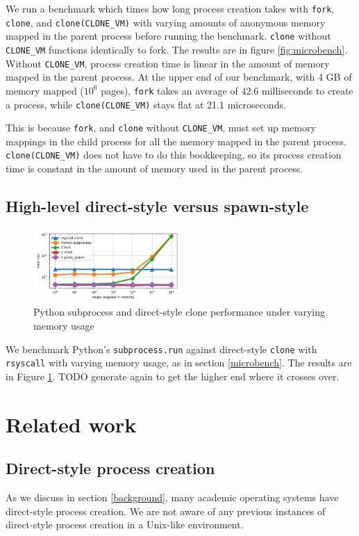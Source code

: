 \documentclass[letterpaper,twocolumn,10pt]{article}
\begin{document}
We run a benchmark which times how long process creation takes
with \texttt{fork}, \texttt{clone}, and \verb|clone(CLONE_VM)|
with varying amounts of anonymous memory mapped in the parent process
before running the benchmark.
\texttt{clone} without \verb|CLONE_VM| functions identically to fork.
The results are in figure \ref{fig:microbench}.
Without \verb|CLONE_VM|,
process creation time is linear in the amount of memory mapped in the parent process.
At the upper end of our benchmark, with 4 GB of memory mapped ($10^6$ pages),
\texttt{fork} takes an average of 42.6 milliseconds to create a process,
while \verb|clone(CLONE_VM)| stays flat at 21.1 microseconds.

This is because \texttt{fork}, and \texttt{clone} without \verb|CLONE_VM|,
must set up memory mappings in the child process for all the memory mapped in the parent process.
\verb|clone(CLONE_VM)| does not have to do this bookkeeping,
so its process creation time is constant in the amount of memory used in the parent process.

\subsection{High-level direct-style versus spawn-style}\label{subprocess_bench}
\begin{figure}[h!]
\centering
 \includegraphics[width=0.5\textwidth]{subprocess_bench}
 \caption{Python subprocess and direct-style clone performance under varying memory usage}
 \label{fig:subprocess_bench}
\end{figure}

We benchmark Python's \texttt{subprocess.run} against direct-style \texttt{clone} with \texttt{rsyscall}
with varying memory usage, as in section \ref{microbench}.
The results are in Figure \ref{fig:subprocess_bench}.
TODO generate again to get the higher end where it crosses over.
\section{Related work}\label{related_work}
\subsection{Direct-style process creation}
As we discuss in section \ref{background},
many academic operating systems have direct-style process creation.
We are not aware of any previous instances of direct-style process creation in a Unix-like environment.
\end{document}
